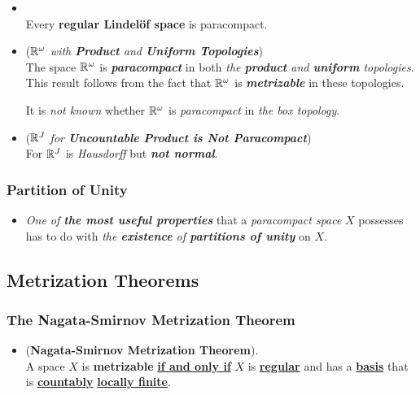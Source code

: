 \documentclass[11pt]{article}
\begin{document}
\begin{itemize}
\item \begin{proposition} \citep{munkres2000topology}\\
Every \textbf{regular Lindel\"of space} is paracompact.
\end{proposition}

\item \begin{example} (\emph{${\mathbb R}^{\omega}$ with \textbf{Product} and \textbf{Uniform Topologies}})\\
The space ${\mathbb R}^{\omega}$ is \emph{\textbf{paracompact}} in both \emph{the \textbf{product} and \textbf{uniform} topologies}.
This result follows from the fact that ${\mathbb R}^{\omega}$ is \emph{\textbf{metrizable}} in these topologies. 

It is \emph{not known} whether ${\mathbb R}^{\omega}$  is \emph{paracompact} in \emph{the box topology}.
\end{example}

\item \begin{example} (\emph{${\mathbb R}^{J}$ for \textbf{Uncountable Product is Not Paracompact}})\\
For ${\mathbb R}^{J}$ is \emph{Hausdorff} but \emph{\textbf{not normal}}.
\end{example}
\end{itemize}

\subsubsection{Partition of Unity}
\begin{itemize}
\item \begin{remark}
\emph{One of \textbf{the most useful properties}} that a \emph{paracompact space} $X$ possesses has to do with \emph{the \textbf{existence} of \textbf{partitions of unity}} on $X$.
\end{remark}
\end{itemize}

\subsection{Metrization Theorems}
\subsubsection{The Nagata-Smirnov Metrization Theorem}
\begin{itemize}
\item \begin{theorem} (\textbf{Nagata-Smirnov Metrization Theorem}). \citep{munkres2000topology} \\
A space $X$ is \textbf{metrizable} \underline{\textbf{if and only if}} $X$ is \underline{\textbf{regular}} and has a \underline{\textbf{basis}} that is \underline{\textbf{countably}} \underline{\textbf{locally finite}}.
\end{theorem}
\end{itemize}
\end{document}
